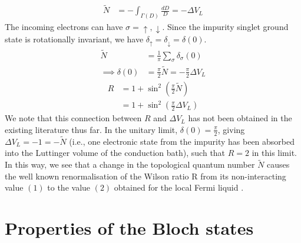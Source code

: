 \documentclass[reprint,hidelinks]{revtex4-2}
\begin{document}
\begin{widetext}
\begin{equation}
\begin{aligned}
\widetilde N &= -\int_{\Gamma(D)}\frac{dD}{D} = -\Delta V_L
\end{aligned}\end{equation}
The incoming electrons can have \(\sigma = \uparrow,\downarrow\).
Since the impurity singlet ground state is rotationally invariant, we have \(\delta_\uparrow = \delta_\downarrow = \delta(0)\).
\begin{equation}\begin{aligned}
\widetilde N &= \frac{1}{\pi}\sum_\sigma\delta_\sigma(0)\\
\implies \delta(0) &= \frac{\pi}{2}\widetilde N = -\frac{\pi}{2}\Delta V_L
\end{aligned}\end{equation}
\begin{equation}\begin{aligned}
\label{wilson_luttinger}
R &= 1 + \sin^2 \left(\frac{\pi}{2}\widetilde N\right)\\
  &= 1 + \sin^2 \left(\frac{\pi}{2}\Delta V_L\right)
\end{aligned}\end{equation}
We note that this connection between \(R\) and \(\Delta V_L\) has not been obtained in the existing literature thus far. In the unitary limit, \(\delta(0) = \frac{\pi}{2}\), giving \(\Delta V_L = -1 = -\tilde N\) \cite{martin1982fermi} (i.e., one electronic state from the impurity has been absorbed into the Luttinger volume of the conduction bath), such that \(R = 2\) in this limit. In this way, we see that a change in the topological quantum number \(\tilde N\) causes the well known renormalisation of the Wilson ratio R from its non-interacting value \((1)\) to the value \((2)\) obtained for the local Fermi liquid \cite{nozieres1974fermi}.

\section{Properties of the Bloch states}


\end{widetext}
\end{document}
